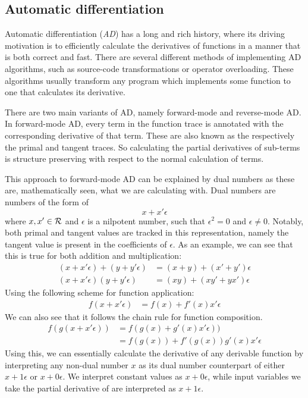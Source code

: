 \subsection{Automatic differentiation}
Automatic differentiation (\textit{AD}) has a long and rich history, where its driving motivation is to efficiently calculate the derivatives of functions in a manner that is both correct and fast\cite{Baydin2015AutomaticDI}.
There are several different methods of implementing AD algorithms, such as source-code transformations or operator overloading.
These algorithms usually transform any program which implements some function to one that calculates its derivative.

There are two main variants of AD, namely forward-mode and reverse-mode AD.
In forward-mode AD, every term in the function trace is annotated with the corresponding derivative of that term.
These are also known as the respectively the primal and tangent traces.
So calculating the partial derivatives of sub-terms is structure preserving with respect to the normal calculation of terms.

This approach to forward-mode AD can be explained by dual numbers as these are, mathematically seen, what we are calculating with\cite{Baydin2015AutomaticDI}. Dual numbers are numbers of the form of
$$
  x + x' \epsilon
$$
where $x, x' \in \mathcal{R}$ and $\epsilon$ is a nilpotent number, such that $\epsilon^2 = 0$ and $\epsilon \neq 0$.
Notably, both primal and tangent values are tracked in this representation, namely the tangent value is present in the coefficients of $\epsilon$.
As an example, we can see that this is true for both addition and multiplication:
\begin{align*}
  (x + x' \epsilon) + (y + y' \epsilon) &= (x + y) + (x' + y')\epsilon \\
  (x + x' \epsilon)(y + y' \epsilon) &= (xy) + (xy' + yx')\epsilon
\end{align*}
Using the following scheme for function application:
\begin{align*}
  f(x + x' \epsilon) &= f(x) + f'(x)x'\epsilon
\end{align*}
We can also see that it follows the chain rule for function composition.
\begin{align*}
  f(g(x + x' \epsilon)) &= f(g(x) + g'(x)x'\epsilon)) \\
    &= f(g(x)) + f'(g(x))g'(x)x'\epsilon
\end{align*}
Using this, we can essentially calculate the derivative of any derivable function by interpreting any non-dual number $x$ as its dual number counterpart of either $x + 1\epsilon$ or $x + 0\epsilon$. We interpret constant values as $x + 0\epsilon$, while input variables we take the partial derivative of are interpreted as $x + 1\epsilon$.

